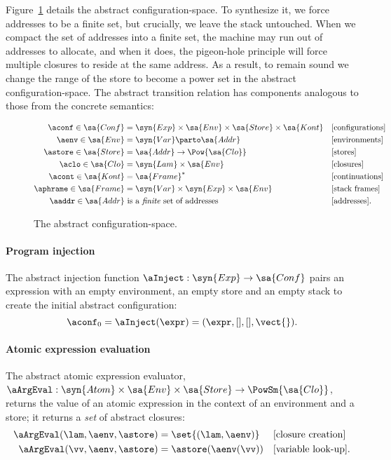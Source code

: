 Figure~\ref{fig:abs-conf-space}
details the 
abstract configuration-space.
To synthesize it, we force addresses to be a finite set, but
crucially, we leave the stack untouched.
When we compact the set of addresses into a finite set, the machine
may run out of addresses to allocate, and when it does, the
pigeon-hole principle will force multiple closures to reside at the
same address.
As a result, to remain sound we change the range of the store to
become a power set in the abstract configuration-space.
The abstract transition relation has  components
analogous to those from the concrete semantics:


\begin{figure}
\figrule
\begin{align*}
\aconf \in \sa{Conf} &= \syn{Exp} \times \sa{Env} \times \sa{Store} \times \sa{Kont} && \text{[configurations]}
\\
  \aenv \in \sa{Env} &= \syn{Var} \parto \sa{Addr} && \text{[environments]}
  \\
    \astore \in \sa{Store} &= \sa{Addr} \to \Pow{\sa{Clo}} && \text{[stores]}
\\
   \aclo \in \sa{Clo} &= \syn{Lam} \times \sa{Env} && \text{[closures]}
 \\
 \acont \in \sa{Kont} &= \sa{Frame}^* && \text{[continuations]}
 \\
 \aphrame \in \sa{Frame} &= \syn{Var} \times \syn{Exp} \times \sa{Env}  && \text{[stack frames]}
 \\
\aaddr \in \sa{Addr} &\text{ is a \emph{finite} set of addresses} && \text{[addresses]}
\text.
\end{align*}
\captionsetup{justification=centering}
\caption{The abstract configuration-space.}
\label{fig:abs-conf-space}
\figrule
\end{figure}


              \paragraph{Program injection}
              The abstract injection function $\aInject : \syn{Exp} \to \sa{Conf}$
              pairs an expression with an empty environment, an empty store and an
              empty stack to create the initial abstract configuration:
              \begin{equation*}
\aconf_0 = \aInject(\expr) = (\expr, [], [], \vect{})
  \text.
  \end{equation*}


\paragraph{Atomic expression evaluation}
The abstract atomic expression evaluator, $\aArgEval : \syn{Atom}
\times \sa{Env} \times \sa{Store} \to \PowSm{\sa{Clo}}$, returns the value of
an atomic expression in the context of an environment and a store;
it returns a \emph{set} of abstract closures:
\begin{align*}
\aArgEval(\lam,\aenv,\astore) &= \set{(\lam,\aenv)} && \text{[closure creation]}
\\
\aArgEval(\vv,\aenv,\astore) &= \astore(\aenv(\vv)) && \text{[variable look-up]}
\text.
\end{align*}



